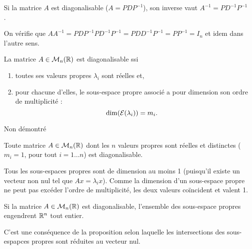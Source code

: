 \begin{proposition*}
  Si la matrice $A$ est diagonalisable ($A = P D P^{-1}$), son inverse vaut $A^{-1} = P D^{-1} P^{-1}$.
\end{proposition*}

\proof
On vérifie que $A A^{-1} = P D P^{-1} P D^{-1} P^{-1} = P D D^{-1} P^{-1} = P P^{-1} = I_n$ et idem dans l'autre sens.
\eproof

\begin{theorem*}
  La matrice $A \in \mathcal{M}_n(\mathbb{R})$ est diagonalisable ssi 
  \begin{enumerate}
   \item toutes ses valeurs propres $\lambda_i$ sont réelles et, 
   \item pour chacune d'elles, le sous-espace propre associé a pour dimension son ordre de multiplicité : 
   $$
   \dim(\mathcal{E}(\lambda_i)) = m_i.
   $$
  \end{enumerate}
\end{theorem*}

\proof
Non démontré
\eproof

\begin{corollary*}
  Toute matrice $A \in \mathcal{M}_n(\mathbb{R})$ dont les $n$ valeurs propres sont réelles et distinctes ($m_i = 1$, pour tout $i = 1 \dots n$) est diagonalisable.
\end{corollary*}

\proof
Tous les sous-espaces propres sont de dimension au moins 1 (puisqu'il existe un vecteur non nul tel que $Ax = \lambda_i x$). Comme la dimension d'un sous-espace propre ne peut pas excéder l'ordre de multiplicité, les deux valeurs coïncident et valent 1.
\eproof

\begin{corollary*}
  Si la matrice $A \in \mathcal{M}_n(\mathbb{R})$ est diagonalisable, l'ensemble des sous-espace propres engendrent $\mathbb{R}^n$ tout entier.
\end{corollary*}

\proof
C'est une conséquence de la proposition selon laquelle les intersections des sous-espapces propres sont réduites au vecteur nul.
\eproof

